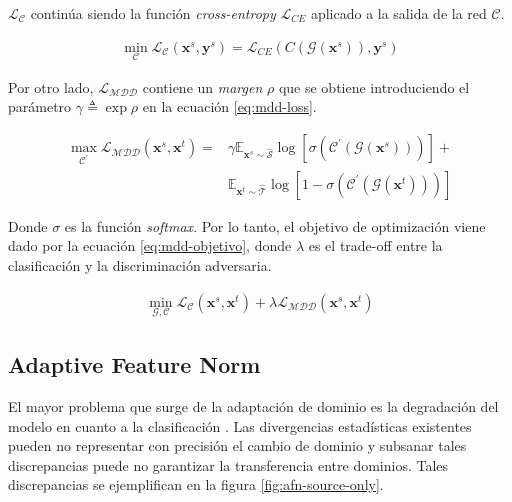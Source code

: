 $\mathcal{L}_{\mathcal{C}}$ contin\'ua siendo la funci\'on {\it cross-entropy} $\mathcal{L}_{CE}$ aplicado a la salida de la red $\mathcal{C}$.

\begin{align}
    \min_{\mathcal{C}} \mathcal{L}_\mathcal{C}(\mathbf{x}^s, \mathbf{y}^s) = \mathcal{L}_{CE}(C(\mathcal{G}(\mathbf{x}^s)), \mathbf{y}^s)
    \label{eq:mdd-loss-clasificadora}
\end{align}

Por otro lado, $\mathcal{L}_{\mathcal{MDD}}$ contiene un {\it margen} $\rho$ que se obtiene introduciendo el
par\'ametro $\gamma \triangleq \exp \rho$ en la ecuaci\'on \ref{eq:mdd-loss}.

\begin{align}
    \max_{\mathcal{C}^{'}} \mathcal{L}_{\mathcal{MDD}}(\mathbf{x}^s, \mathbf{x}^t) = & \gamma \mathbb{E}_{\mathbf{x}^s \sim \mathcal{\hat{S}}} \log[\sigma(\mathcal{C}^{'}(\mathcal{G}(\mathbf{x}^s)))] + \nonumber \\
                                                                                     & \mathbb{E}_{\mathbf{x}^t \sim \mathcal{\hat{T}}} \log[1-\sigma(\mathcal{C}^{'}(\mathcal{G}(\mathbf{x}^t)))]
    \label{eq:mdd-loss}
\end{align}

Donde $\sigma$ es la funci\'on {\it softmax}. Por lo tanto, el objetivo de optimización viene dado por la ecuaci\'on
\ref{eq:mdd-objetivo}, donde $\lambda$ es el trade-off entre la clasificaci\'on y la discriminaci\'on adversaria.

\begin{align}
    \min_{\mathcal{G}, \mathcal{C}} \mathcal{L}_{\mathcal{C}}(\mathbf{x}^s, \mathbf{x}^t) + \lambda \mathcal{L}_{\mathcal{MDD}}(\mathbf{x}^s, \mathbf{x}^t)
    \label{eq:mdd-objetivo}
\end{align}

\subsection{Adaptive Feature Norm}

El mayor problema que surge de la adaptaci\'on de dominio es la degradaci\'on del modelo en cuanto a la clasificaci\'on \parencite{yosinski2014transferable}. Las divergencias estadísticas existentes pueden no representar con precisión el
cambio de dominio y subsanar tales discrepancias puede no garantizar la transferencia entre dominios. Tales
discrepancias se ejemplifican en la figura \ref{fig:afn-source-only}.

